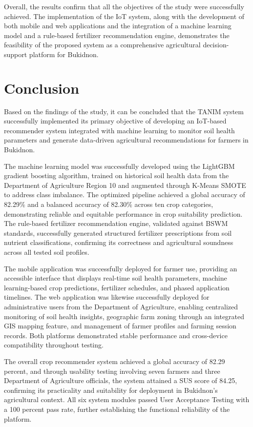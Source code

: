 {Overall, the results confirm that all the objectives of the study were successfully achieved. The implementation of the IoT system, along with the development of both mobile and web applications and the integration of a machine learning model and a rule-based fertilizer recommendation engine, demonstrates the feasibility of the proposed system as a comprehensive agricultural decision-support platform for Bukidnon.

\section{Conclusion}

Based on the findings of the study, it can be concluded that the TANIM system successfully implemented its primary objective of developing an IoT-based recommender system integrated with machine learning to monitor soil health parameters and generate data-driven agricultural recommendations for farmers in Bukidnon.

The machine learning model was successfully developed using the LightGBM gradient boosting algorithm, trained on historical soil health data from the Department of Agriculture Region 10 and augmented through K-Means SMOTE to address class imbalance. The optimized pipeline achieved a global accuracy of 82.29\% and a balanced accuracy of 82.30\% across ten crop categories, demonstrating reliable and equitable performance in crop suitability prediction. The rule-based fertilizer recommendation engine, validated against BSWM standards, successfully generated structured fertilizer prescriptions from soil nutrient classifications, confirming its correctness and agricultural soundness across all tested soil profiles.

The mobile application was successfully deployed for farmer use, providing an accessible interface that displays real-time soil health parameters, machine learning-based crop predictions, fertilizer schedules, and phased application timelines. The web application was likewise successfully deployed for administrative users from the Department of Agriculture, enabling centralized monitoring of soil health insights, geographic farm zoning through an integrated GIS mapping feature, and management of farmer profiles and farming session records. Both platforms demonstrated stable performance and cross-device compatibility throughout testing.

The overall crop recommender system achieved a global accuracy of 82.29 percent, and through usability testing involving seven farmers and three Department of Agriculture officials, the system attained a SUS score of 84.25, confirming its practicality and suitability for deployment in Bukidnon's agricultural context. All six system modules passed User Acceptance Testing with a 100 percent pass rate, further establishing the functional reliability of the platform.

}
